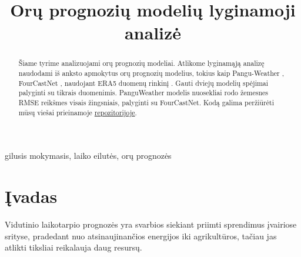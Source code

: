 \documentclass[conference]{IEEEtran}
\begin{document}
\title{Orų prognozių modelių lyginamoji analizė}

\author{
\and
{}
\and
{}
}

\maketitle

\begin{abstract}
Šiame tyrime analizuojami orų prognozių modeliai. Atlikome lyginamąją analizę naudodami iš anksto apmokytus orų prognozių modelius, tokius kaip Pangu-Weather \cite{bi2023accurate}, FourCastNet \cite{pathak2022fourcastnet}, naudojant ERA5 duomenų rinkinį \cite{data}. Gauti dviejų modelių spėjimai palyginti su tikrais duomenimis. PanguWeather modelis nuosekliai rodo žemesnes RMSE reikšmes visais žingsniais, palyginti su FourCastNet. Kodą galima peržiūrėti mūsų viešai prieinamoje \href{https://github.com/three-unicorns/time-series-forecast}{repozitorijoje}.
\end{abstract}

\begin{IEEEkeywords}
gilusis mokymasis, laiko eilutės, orų prognozės
\end{IEEEkeywords}

\section{Įvadas}

 Vidutinio laikotarpio prognozės yra svarbios siekiant priimti sprendimus įvairiose srityse, pradedant nuo atsinaujinančios energijos iki agrikultūros, tačiau jas atlikti tiksliai reikalauja daug resursų.
\end{document}
